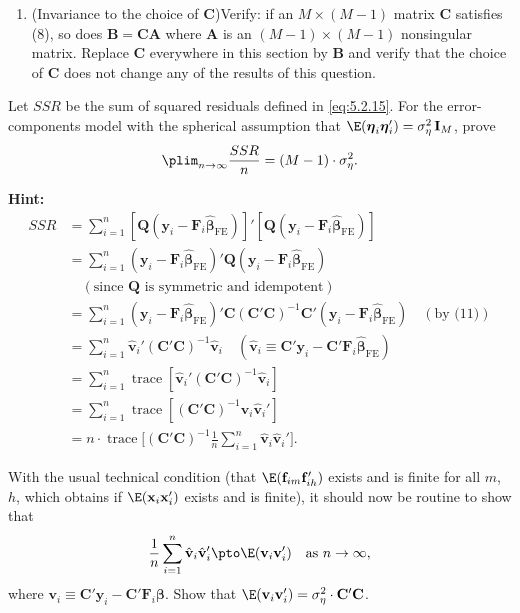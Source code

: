 \begin{problemset}
\begin{enumerate}[label=(\alph*)]
\item (Invariance to the choice of $\mathbf{C}$)\quad Verify: if an $M \times (M-1)$ matrix $\mathbf{C}$ satisfies
  (8), so does $\mathbf{B} = \mathbf{C}\mathbf{A}$ where $\mathbf{A}$ is an $(M-1) \times (M-1)$ nonsingular matrix.
  Replace $\mathbf{C}$ everywhere in this section by $\mathbf{B}$ and verify that the choice of $\mathbf{C}$
  does not change any of the results of this question.
\end{enumerate}

\exercise[3]
Let $SSR$ be the sum of squared residuals defined in \eqref{eq:5.2.15}. For the error-components
model with the spherical assumption that
$\E(\boldsymbol{\eta}_i\boldsymbol{\eta}_i') = \sigma_\eta^2\,\mathbf{I}_M$, prove
\[
  \plim_{n \to \infty} \frac{SSR}{n} = (M - 1) \cdot \sigma_\eta^2.
\]

\textbf{Hint:}
\begin{align*}
  SSR &= \sum_{i=1}^{n}[\mathbf{Q}(\mathbf{y}_i - \mathbf{F}_i\hat{\boldsymbol{\beta}}_{\text{FE}})]'
  [\mathbf{Q}(\mathbf{y}_i - \mathbf{F}_i\hat{\boldsymbol{\beta}}_{\text{FE}})] \\
  &= \sum_{i=1}^{n}(\mathbf{y}_i - \mathbf{F}_i\hat{\boldsymbol{\beta}}_{\text{FE}})'\mathbf{Q}
  (\mathbf{y}_i - \mathbf{F}_i\hat{\boldsymbol{\beta}}_{\text{FE}}) \\
  &\quad (\text{since } \mathbf{Q} \text{ is symmetric and idempotent}) \\
  &= \sum_{i=1}^{n}(\mathbf{y}_i - \mathbf{F}_i\hat{\boldsymbol{\beta}}_{\text{FE}})'
  \mathbf{C}(\mathbf{C}'\mathbf{C})^{-1}\mathbf{C}'
  (\mathbf{y}_i - \mathbf{F}_i\hat{\boldsymbol{\beta}}_{\text{FE}})
  \quad (\text{by (11)}) \\
  &= \sum_{i=1}^{n}\hat{\mathbf{v}}_i'(\mathbf{C}'\mathbf{C})^{-1}\hat{\mathbf{v}}_i
  \quad (\hat{\mathbf{v}}_i \equiv \mathbf{C}'\mathbf{y}_i
  - \mathbf{C}'\mathbf{F}_i\hat{\boldsymbol{\beta}}_{\text{FE}}) \\
  &= \sum_{i=1}^{n}\operatorname{trace}[\hat{\mathbf{v}}_i'(\mathbf{C}'\mathbf{C})^{-1}\hat{\mathbf{v}}_i] \\
  &= \sum_{i=1}^{n}\operatorname{trace}[(\mathbf{C}'\mathbf{C})^{-1}\hat{\mathbf{v}}_i\hat{\mathbf{v}}_i'] \\
  &= n \cdot \operatorname{trace}\biggl[(\mathbf{C}'\mathbf{C})^{-1}
  \frac{1}{n}\sum_{i=1}^{n}\hat{\mathbf{v}}_i\hat{\mathbf{v}}_i'\biggr].
\end{align*}

With the usual technical condition (that $\E(\mathbf{f}_{im}\mathbf{f}_{ih}')$ exists and is finite for all $m$, $h$,
which obtains if $\E(\mathbf{x}_i\mathbf{x}_i')$ exists and is finite), it should now be routine to show
that
\[
  \frac{1}{n}\sum_{i=1}^{n}\hat{\mathbf{v}}_i\hat{\mathbf{v}}_i'
  \pto \E(\mathbf{v}_i\mathbf{v}_i') \quad \text{as } n \to \infty,
\]
where $\mathbf{v}_i \equiv \mathbf{C}'\mathbf{y}_i - \mathbf{C}'\mathbf{F}_i\boldsymbol{\beta}$.
Show that $\E(\mathbf{v}_i\mathbf{v}_i') = \sigma_\eta^2 \cdot \mathbf{C}'\mathbf{C}$.


\end{problemset}
